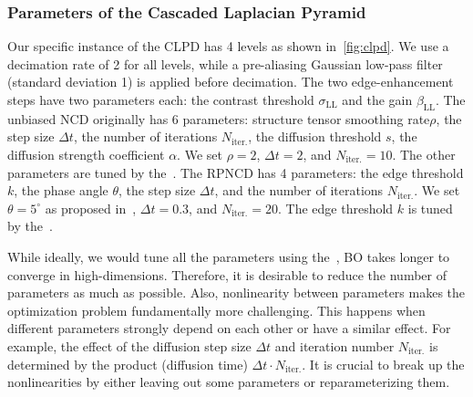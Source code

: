 \subsubsection{Parameters of the Cascaded Laplacian Pyramid}
Our specific instance of the CLPD has 4 levels as shown in~\cref{fig:clpd}.
We use a decimation rate of 2 for all levels, while a pre-aliasing Gaussian low-pass filter (standard deviation 1) is applied before decimation.
The two edge-enhancement steps have two parameters each: the contrast threshold \(\sigma_{\mathrm{LL}}\) and the gain \(\beta_{\mathrm{LL}}\).
The unbiased NCD originally has 6 parameters: structure tensor smoothing rate\(\rho\), the step size \(\Delta t\), the number of iterations \(N_{\text{iter.}}\), the diffusion threshold \(s\), the diffusion strength coefficient \(\alpha\).
We set \(\rho = 2\), \(\Delta t = 2\), and \(N_{\text{iter.}} = 10\).
The other parameters are tuned by the~\usdg.
The RPNCD has 4 parameters: the edge threshold \(k\), the phase angle \(\theta\), the step size \(\Delta t\), and the number of iterations \(N_{\text{iter.}}\).
We set \(\theta = 5^{\circ}\) as proposed in~\cite{gilboa_image_2004}, \(\Delta t = 0.3\), and \(N_{\text{iter.}} = 20\).
The edge threshold \(k\) is tuned by the~\usdg.

While ideally, we would tune all the parameters using the~\usdg, BO takes longer to converge in high-dimensions.
Therefore, it is desirable to reduce the number of parameters as much as possible.
Also, nonlinearity between parameters makes the optimization problem fundamentally more challenging.
This happens when different parameters strongly depend on each other or have a similar effect.
For example, the effect of the diffusion step size \(\Delta t\) and iteration number \(N_{\text{iter.}}\) is determined by the product (diffusion time) \(\Delta t \cdot N_{\text{iter.}}\).
It is crucial to break up the nonlinearities by either leaving out some parameters or reparameterizing them.


